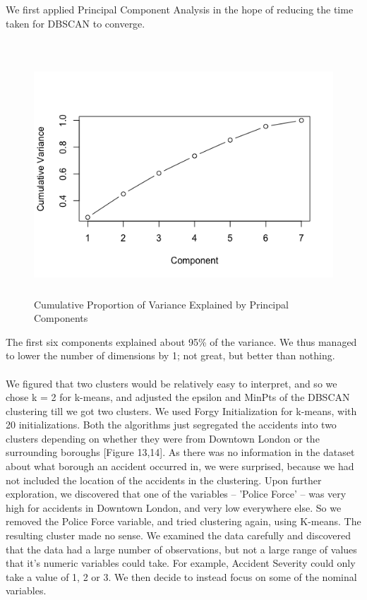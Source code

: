 \documentclass[a4paper, 11pt]{article}
\begin{document}
We first applied Principal Component Analysis in the hope of reducing the time taken for DBSCAN to converge. \\ \\

\begin{figure}[H]
    \begin{center}
      \includegraphics[height=9cm, width=20cm,keepaspectratio]{PCA.png}
      \caption{Cumulative Proportion of Variance Explained by Principal Components}
    \end{center}
\end{figure}

The first six components explained about 95\% of the variance. We thus managed to lower the number of dimensions by 1; not great, but better than nothing. \\ \\

We figured that two clusters would be relatively easy to interpret, and so we chose k = 2 for k-means, and adjusted the epsilon and MinPts of the DBSCAN clustering till we got two clusters. We used Forgy Initialization for k-means, with 20 initializations. Both the algorithms just segregated the accidents into two clusters depending on whether they were from Downtown London or the surrounding boroughs [Figure 13,14]. As there was no information in the dataset about what borough an accident occurred in, we were surprised, because we had not included the location of the accidents in the clustering. Upon further exploration, we discovered that one of the variables -- 'Police Force' -- was very high for accidents in Downtown London, and very low everywhere else. So we removed the Police Force variable, and tried clustering again, using K-means. The resulting cluster made no sense. We examined the data carefully and discovered that the data had a large number of observations, but not a large range of values that it's numeric variables could take. For example, Accident Severity could only take a value of 1, 2 or 3. We then decide to instead focus on some of the nominal variables.
\end{document}
